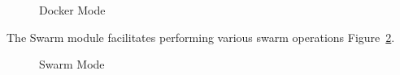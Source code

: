\documentclass[9pt,twocolumn,twoside]{../../styles/osajnl}
\begin{document}
\begin{figure}[h!]
\centering
{}
\caption{Docker Mode }
\label{fig:cmsdocker}
\end{figure}

The Swarm module facilitates performing various swarm operations Figure~\ref{fig:cmsswarm}.

\begin{figure}[h!]
\centering
{}
\caption{Swarm Mode }
\label{fig:cmsswarm}
\end{figure}
\end{document}
